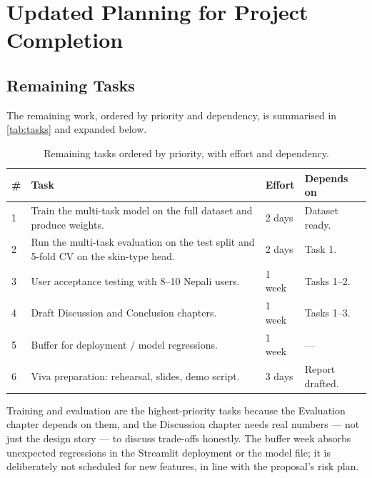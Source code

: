 \documentclass[11pt,a4paper]{article}
\let\oldsection\section
\renewcommand{\section}{\clearpage\oldsection}
\begin{document}
\section{Updated Planning for Project Completion}

\subsection{Remaining Tasks}

The remaining work, ordered by priority and dependency, is summarised
in \autoref{tab:tasks} and expanded below.

\begin{table}[!ht]
  \centering
  \caption{Remaining tasks ordered by priority, with effort and dependency.}
  \label{tab:tasks}
  \begin{tabularx}{\linewidth}{@{}p{0.6cm} X p{1.4cm} p{2.6cm}@{}}
    \toprule
    \textbf{\#} & \textbf{Task} & \textbf{Effort} & \textbf{Depends on} \\
    \midrule
    1 & Train the multi-task model on the full dataset and produce weights. & 2 days  & Dataset ready. \\
    2 & Run the multi-task evaluation on the test split and 5-fold CV on the skin-type head. & 2 days  & Task 1. \\
    3 & User acceptance testing with 8--10 Nepali users. & 1 week  & Tasks 1--2. \\
    4 & Draft Discussion and Conclusion chapters.       & 1 week  & Tasks 1--3. \\
    5 & Buffer for deployment / model regressions.       & 1 week  & --- \\
    6 & Viva preparation: rehearsal, slides, demo script. & 3 days  & Report drafted. \\
    \bottomrule
  \end{tabularx}
\end{table}

Training and evaluation are the highest-priority tasks because the
Evaluation chapter depends on them, and the Discussion chapter needs
real numbers --- not just the design story --- to discuss trade-offs
honestly. The buffer week absorbs unexpected regressions in the
Streamlit deployment or the model file; it is deliberately not
scheduled for new features, in line with the proposal's risk plan.
\end{document}
